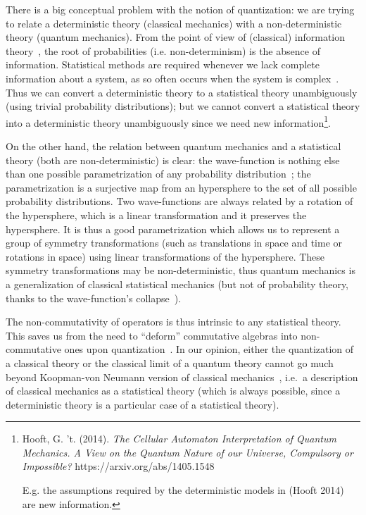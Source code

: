 \documentclass[11pt]{book}
\begin{document}
There is a big conceptual problem with the notion of quantization: we
are trying to relate a deterministic theory (classical mechanics) with a
non-deterministic theory (quantum mechanics). From the point of view of
(classical) information
theory~\cite{Shannon1948mathematical},
the root of probabilities (i.e. non-determinism) is the absence of
information. Statistical methods are required whenever we lack complete
information about a system, as so often occurs when the system is
complex~\cite{Bertin2016Statistical}.
Thus we can convert a deterministic theory to a statistical theory
unambiguously (using trivial probability distributions); but we cannot
convert a statistical theory into a deterministic theory unambiguously
since we need new information\footnote{Hooft, G. 't. (2014). \emph{The
  Cellular Automaton Interpretation of Quantum Mechanics. A View on the
  Quantum Nature of our Universe, Compulsory or Impossible?}
  https://arxiv.org/abs/1405.1548

  E.g. the assumptions required by the deterministic models in (Hooft
  2014) are new information.}.

On the other hand, the relation between quantum mechanics and a
statistical theory (both are non-deterministic) is clear: the
wave-function is nothing else than one possible parametrization of any
probability
distribution~\cite{Pedro2017Relating};
the parametrization is a surjective map from an hypersphere to the set
of all possible probability distributions. Two wave-functions are always
related by a rotation of the hypersphere, which is a linear
transformation and it preserves the hypersphere. It is thus a good
parametrization which allows us to represent a group of symmetry
transformations (such as translations in space and time or rotations in
space) using linear transformations of the hypersphere. These symmetry
transformations may be non-deterministic, thus quantum mechanics is a
generalization of classical statistical mechanics (but not of
probability theory, thanks to the wave-function's
collapse~\cite{Pedro2017Relating}).

The non-commutativity of operators is thus intrinsic to any statistical
theory. This saves us from the need to ``deform'' commutative algebras
into non-commutative ones upon
quantization~\cite{Berra2020Coherent}. In our opinion, either the quantization of a classical
theory or the classical limit of a quantum theory cannot go much beyond
Koopman-von Neumann version of classical
mechanics~\cite{Sudarshan1976Interaction}, i.e.~a description of classical mechanics as a statistical
theory (which is always possible, since a deterministic theory is a
particular case of a statistical theory).
\end{document}
